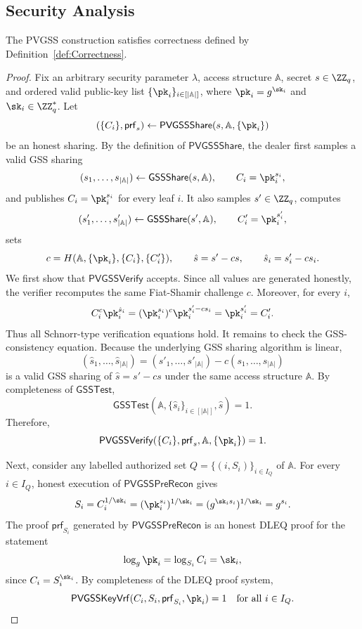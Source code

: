 \documentclass[runningheads]{llncs}
\newcommand{\gssshare}{\mathsf{GSSShare}}
\newcommand{\gsstest}{\mathsf{GSSTest}}
\newcommand{\pvgssShare}{\mathsf{PVGSSShare}}
\newcommand{\pvgssVerify}{\mathsf{PVGSSVerify}}
\newcommand{\pvgssPreRecon}{\mathsf{PVGSSPreRecon}}
\newcommand{\pvgssKeyVrf}{\mathsf{PVGSSKeyVrf}}
\newcommand{\proofs}{\mathsf{prf}}
\begin{document}


\subsection{Security Analysis}
\label{sec:pvgss_security_analysis}


\begin{theorem}[Correctness]\label{theo:correctness}
The PVGSS construction satisfies correctness defined by Definition~\ref{def:Correctness}.
\end{theorem}
\begin{proof}
  Fix an arbitrary security parameter \(\lambda\), access structure
  \(\mathbb{A}\), secret \(s\in\ZZ_q\), and ordered valid public-key
  list
  \(\{\pk_i\}_{i\in[|\mathbb{A}|]}\), where \(\pk_i=g^{\sk_i}\) and
  \(\sk_i\in\ZZ_q^*\). Let
  \[
      (\{C_i\},\proofs_s)\gets
      \pvgssShare(s,\mathbb{A},\{\pk_i\})
  \]
  be an honest sharing. By the definition of \(\pvgssShare\), the
  dealer first
  samples a valid GSS sharing
  \[
      (s_1,\ldots,s_{|\mathbb{A}|})\gets \gssshare(s,\mathbb{A}), \qquad C_i=\pk_i^{s_i},
  \]
  and publishes \(C_i=\pk_i^{s_i}\) for every leaf \(i\). It also
  samples
  \(s'\in\ZZ_q\), computes
  \[
      (s'_1,\ldots,s'_{|\mathbb{A}|})\gets \gssshare(s',\mathbb{A}),
      \qquad C'_i=\pk_i^{s'_i},
  \]
  sets
  \[
      c=H(\mathbb{A},\{\pk_i\},\{C_i\},\{C'_i\}),\qquad
      \hat{s}=s'-cs,\qquad
      \hat{s}_i=s'_i-cs_i .
  \]
  We first show that \(\pvgssVerify\) accepts. Since all values are
  generated
  honestly, the verifier recomputes the same Fiat-Shamir challenge
  \(c\). Moreover,
  for every \(i\),
  \[
      C_i^c\pk_i^{\hat{s}_i}
      =(\pk_i^{s_i})^c\pk_i^{s'_i-cs_i}
      =\pk_i^{s'_i}
      =C'_i .
  \]
  Thus all Schnorr-type verification equations hold. It remains to
  check the
  GSS-consistency equation. Because the underlying GSS sharing
  algorithm is linear,
  \[
      (\hat{s}_1,\ldots,\hat{s}_{|\mathbb{A}|})
      =(s'_1,\ldots,s'_{|\mathbb{A}|})
        -c(s_1,\ldots,s_{|\mathbb{A}|})
  \]
  is a valid GSS sharing of \(\hat{s}=s'-cs\) under the same access
  structure
  \(\mathbb{A}\). By completeness of \(\gsstest\),
  \[
      \gsstest(\mathbb{A},\{\hat{s}_i\}_{i\in[|\mathbb{A}|]},
  \hat{s})=1 .
  \]
  Therefore,
  \[
      \pvgssVerify(\{C_i\},\proofs_s,\mathbb{A},\{\pk_i\})=1 .
  \]

  Next, consider any labelled authorized set
  \(Q=\{(i,S_i)\}_{i\in I_Q}\) of \(\mathbb{A}\). For every \(i\in
  I_Q\), honest
  execution of \(\pvgssPreRecon\) gives
  \[
      S_i=C_i^{1/\sk_i}
         =(\pk_i^{s_i})^{1/\sk_i}
         =(g^{\sk_i s_i})^{1/\sk_i}
         =g^{s_i}.
  \]
  The proof \(\proofs_{S_i}\) generated by \(\pvgssPreRecon\) is an
  honest DLEQ
  proof for the statement
  \[
      \log_g \pk_i=\log_{S_i} C_i=\sk_i ,
  \]
  since \(C_i=S_i^{\sk_i}\). By completeness of the DLEQ proof
  system,
  \[
      \pvgssKeyVrf(C_i,S_i,\proofs_{S_i},\pk_i)=1
      \quad\text{for all } i\in I_Q .
  \]


\end{proof}
\end{document}
